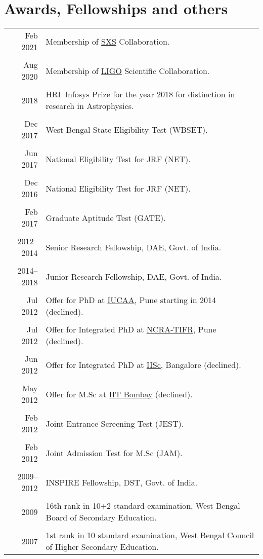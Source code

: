 \documentclass[10pt]{article}
\begin{document}
\section*{Awards, Fellowships and others}
\begin{longtable}{rp{14cm}}
Feb 2021 & Membership of \href{https://www.black-holes.org/}{SXS} Collaboration.\\\\
Aug 2020 & Membership of \href{https://www.ligo.org/}{LIGO} Scientific Collaboration.\\\\
2018 & HRI--Infosys Prize for the year 2018 for distinction in research in Astrophysics.\\\\
Dec 2017 & West Bengal State Eligibility Test (WBSET).\\\\
Jun 2017 & National Eligibility Test for JRF (NET).\\\\
Dec 2016 & National Eligibility Test for JRF (NET).\\\\
Feb 2017 & Graduate Aptitude Test (GATE).\\\\
2012--2014 & Senior Research Fellowship, DAE, Govt. of India.\\\\
2014--2018 & Junior Research Fellowship, DAE, Govt. of India.\\\\
Jul 2012 & Offer for PhD at \href{https://www.iucaa.in/}{IUCAA}, Pune starting in 2014 (declined).\\\\
Jul 2012 & Offer for Integrated PhD at \href{http://www.ncra.tifr.res.in/ncra/main}{NCRA-TIFR}, Pune (declined).\\\\
Jun 2012 & Offer for Integrated PhD at \href{https://www.iisc.ac.in/}{IISc}, Bangalore (declined).\\\\
May 2012 & Offer for M.Sc at \href{http://www.iitb.ac.in/}{IIT Bombay} (declined).\\\\
Feb 2012 & Joint Entrance Screening Test (JEST).\\\\
Feb 2012 & Joint Admission Test for M.Sc (JAM).\\\\
2009--2012 & INSPIRE Fellowship, DST, Govt. of India.\\\\
2009 & {16th} rank in 10+2 standard examination, West Bengal Board of Secondary Education.\\\\
2007 & {1st} rank in 10 standard examination, West Bengal Council of Higher Secondary Education.
\end{longtable}
\end{document}
